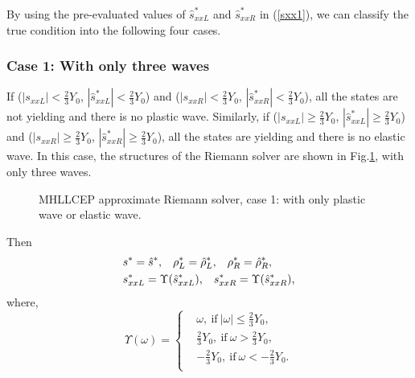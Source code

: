 \documentclass[review]{elsarticle}
\begin{document}

By using the pre-evaluated values of $\hat{s}_{xxL}^*$ and $\hat{s}_{xxR}^*$ in (\ref{sxx1}), we can classify the true condition into the following four cases.


\subsubsection{Case 1: With only three waves}\label{sec:case1}
%
If ($|s_{xxL}|<\frac{2}{3}Y_0$, $|\hat{s}_{xxL}^*| < \frac{2}{3}Y_0$)  and  ($|s_{xxR}|<\frac{2}{3}Y_0$, $|\hat{s}_{xxR}^*| < \frac{2}{3}Y_0$), all the states are not yielding and there is no plastic wave. Similarly, if ($|s_{xxL}|  \ge \frac{2}{3}Y_0$, $|\hat{s}_{xxL}^*| \ge  \frac{2}{3}Y_0$)  and  ($|s_{xxR}| \ge \frac{2}{3}Y_0$, $|\hat{s}_{xxR}^*| \ge  \frac{2}{3}Y_0$), all the states are yielding and there is no elastic wave.
In this case, the structures  of the Riemann solver are shown in Fig.\ref{fig:case1}, with only three waves.

\begin{figure}[htp]
  \centering
\caption{MHLLCEP approximate Riemann solver, case 1: with only plastic wave or elastic wave.}
\label{fig:case1}
 \end{figure}

Then
\begin{align}
&  s^* = \hat{s}^*,\hspace{0.3cm} \rho^*_L = \hat{\rho}_L^*, \hspace{0.3cm} \rho_R^* = \hat{\rho}_R^*,\\
&  s_{xxL}^*  = \Upsilon(\hat{s}_{xxL}^*),\hspace{0.3cm} s_{xxR}^*  = \Upsilon(\hat{s}_{xxR}^*),
\end{align}
where,
\begin{equation}\label{eq:upsilon}
  \Upsilon(\omega) = \left\{ \begin{aligned}
      &\omega, \  \text{if} \  |\omega| \le \frac{2}{3}Y_0,\\
      &\frac{2}{3}Y_0,  \ \text{if} \  \omega > \frac{2}{3}Y_0,\\
     &-\frac{2}{3}Y_0,  \  \text{if} \ \omega < -\frac{2}{3}Y_0.\\
 \end{aligned}\right.
 \end{equation}
\end{document}
